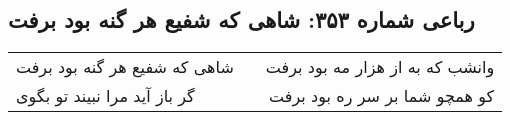 \begin{center}
\section*{رباعی شماره ۳۵۳: شاهی که شفیع هر گنه بود برفت}
\label{sec:0353}
\begin{longtable}{l p{0.5cm} r}
شاهی که شفیع هر گنه بود برفت
&&
وانشب که به از هزار مه بود برفت
\\
گر باز آید مرا نبیند تو بگوی
&&
کو همچو شما بر سر ره بود برفت
\\
\end{longtable}
\end{center}

